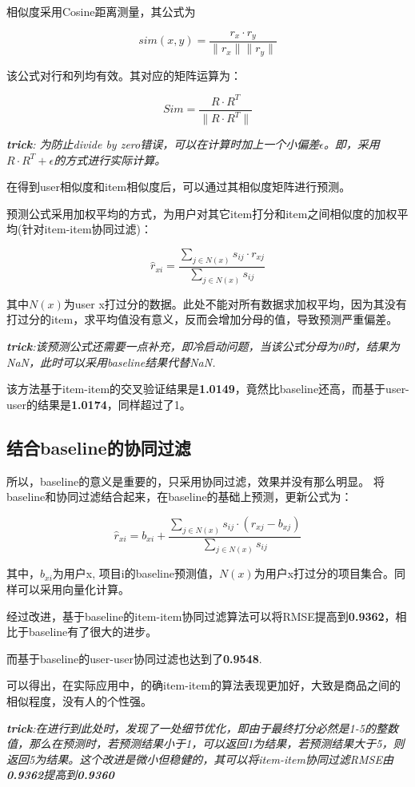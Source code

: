 \documentclass[utf8, a4paper, 11pt, onecolumn]{ctexart}
\begin{document}
\begin{spacing}{1.3}
相似度采用Cosine距离测量，其公式为

\[sim(x,y) = \frac{r_x \cdot r_y}{\| r_x \| \| r_y\|}\]

该公式对行和列均有效。其对应的矩阵运算为：

\[Sim = \frac{R \cdot R^T}{\| R\cdot R^T \|}\]

\textit{\textbf{trick}: 为防止divide by zero错误，可以在计算时加上一个小偏差$\epsilon$。即，采用$R\cdot R^T + \epsilon$的方式进行实际计算。}

在得到user相似度和item相似度后，可以通过其相似度矩阵进行预测。

预测公式采用加权平均的方式，为用户对其它item打分和item之间相似度的加权平均(针对item-item协同过滤)：

\[\hat{r}_{xi} = \frac{\sum_{j \in N(x)} s_{ij} \cdot r_{xj}}{\sum_{j \in N(x)} s_{ij}} \]

其中$N(x)$为user x打过分的数据。此处不能对所有数据求加权平均，因为其没有打过分的item，求平均值没有意义，反而会增加分母的值，导致预测严重偏差。

\textit{\textbf{trick}:该预测公式还需要一点补充，即冷启动问题，当该公式分母为0时，结果为NaN，此时可以采用baseline结果代替NaN.}

该方法基于item-item的交叉验证结果是\textbf{1.0149}，竟然比baseline还高，而基于user-user的结果是\textbf{1.0174}，同样超过了1。

\subsection{结合baseline的协同过滤}

所以，baseline的意义是重要的，只采用协同过滤，效果并没有那么明显。
将baseline和协同过滤结合起来，在baseline的基础上预测，更新公式为：

\[\hat{r}_{xi} = b_{xi}  + \frac{\sum_{j \in N(x)} s_{ij} \cdot (r_{xj} - b_{xj})}{\sum_{j \in N(x)} s_{ij}} \]

其中，$b_{xi}$为用户x, 项目i的baseline预测值，$N(x)$为用户x打过分的项目集合。同样可以采用向量化计算。

经过改进，基于baseline的item-item协同过滤算法可以将RMSE提高到\textbf{0.9362}，相比于baseline有了很大的进步。

而基于baseline的user-user协同过滤也达到了\textbf{0.9548}.

可以得出，在实际应用中，的确item-item的算法表现更加好，大致是商品之间的相似程度，没有人的个性强。

\textit{\textbf{trick}:在进行到此处时，发现了一处细节优化，即由于最终打分必然是1-5的整数值，那么在预测时，若预测结果小于1，可以返回1为结果，若预测结果大于5，则返回5为结果。这个改进是微小但稳健的，其可以将item-item协同过滤RMSE由\textbf{0.9362}提高到\textbf{0.9360}}


\end{spacing}
\end{document}
